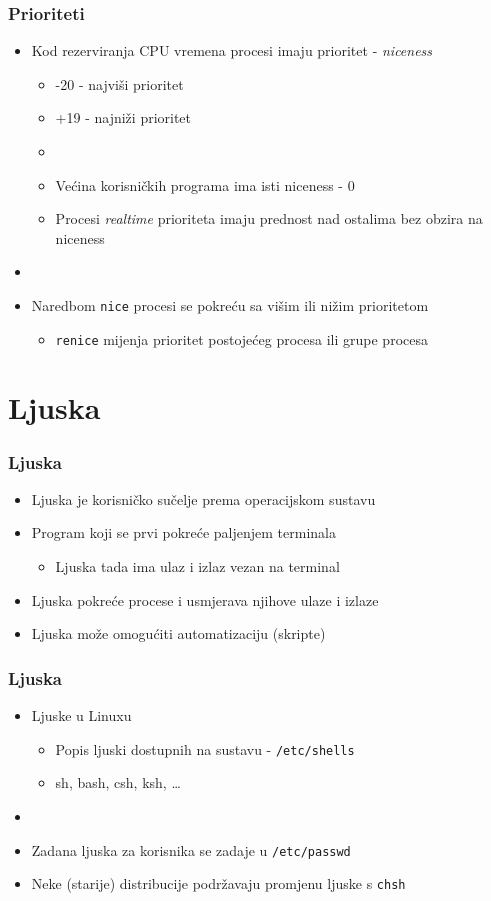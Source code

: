 \documentclass[table,usenames,dvipsnames]{beamer}
\newcommand{\shell}[1]{\texttt{#1}}
\begin{document}
\begin{frame}[t]
\frametitle{Prioriteti}
\begin{itemize}
  \item Kod rezerviranja CPU vremena procesi imaju prioritet - \emph{niceness}
  \begin{itemize}
    \item -20 - najviši prioritet
    \item +19 - najniži prioritet
    \item[]
    \item Većina korisničkih programa ima isti niceness - 0
    \item Procesi \emph{realtime} prioriteta imaju prednost nad ostalima bez obzira na niceness
  \end{itemize}
  \item[]
  \item Naredbom \shell{nice} procesi se pokreću sa višim ili nižim prioritetom
  \begin{itemize}
    \item \shell{renice} mijenja prioritet postojećeg procesa ili grupe procesa
  \end{itemize}
\end{itemize}
\end{frame}


\section{Ljuska}
\begin{frame}[t]
	\frametitle{Ljuska}
	\begin{itemize}
		\item Ljuska je korisničko sučelje prema operacijskom sustavu
		\item Program koji se prvi pokreće paljenjem terminala
		\begin{itemize}
			\item Ljuska tada ima ulaz i izlaz vezan na terminal
		\end{itemize}
		\item Ljuska pokreće procese i usmjerava njihove ulaze i izlaze
		\item Ljuska može omogućiti automatizaciju (skripte)
	\end{itemize}
\end{frame}

\begin{frame}[t]
	\frametitle{Ljuska}
	\begin{itemize}
		\item Ljuske u Linuxu
		\begin{itemize}
			\item Popis ljuski dostupnih na sustavu - \shell{/etc/shells}
			\item sh, bash, csh, ksh, \ldots
		\end{itemize}
		\item[]
		\item Zadana ljuska za korisnika se zadaje u \shell{/etc/passwd}
		\item Neke (starije) distribucije podržavaju promjenu ljuske s \shell{chsh}
	\end{itemize}
\end{frame}
\end{document}

